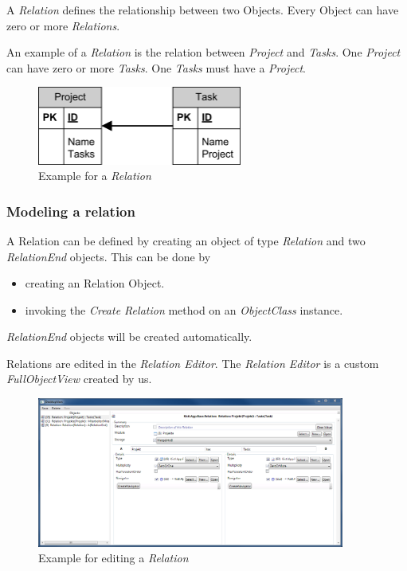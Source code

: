 A \emph{Relation} defines the relationship between two Objects. Every Object can have zero or more \emph{Relations}.
\par
An example of a \emph{Relation} is the relation between \emph{Project} and \emph{Tasks}. One \emph{Project} can have zero or more \emph{Tasks}. One \emph{Tasks} must have a \emph{Project}.

\begin{figure}[ht]
	\begin{center}
		\includegraphics[width=0.6\textwidth]{images/Rel_1_n_Project_Tasks.png}
		\caption{Example for a \emph{Relation}}
		\label{example_for_relation}
	\end{center}
\end{figure}


\subsubsection{Modeling a relation}
A Relation can be defined by creating an object of type \emph{Relation} and two \emph{RelationEnd} objects. This can be done by
\begin{itemize}
	\item creating an Relation Object. 
	\item invoking the \emph{Create Relation} method on an \emph{ObjectClass} instance.
\end{itemize}

\emph{RelationEnd} objects will be created automatically.

\par
Relations are edited in the \emph{Relation Editor}. The \emph{Relation Editor} is a custom \emph{FullObjectView} created by us.

\begin{figure}[ht]
	\begin{center}
		\includegraphics[width=0.9\textwidth]{images/ScreenShot_Rel_Project_Task.png}
		\caption{Example for editing a \emph{Relation}}
		\label{example_for_editing_relation}
	\end{center}
\end{figure}

